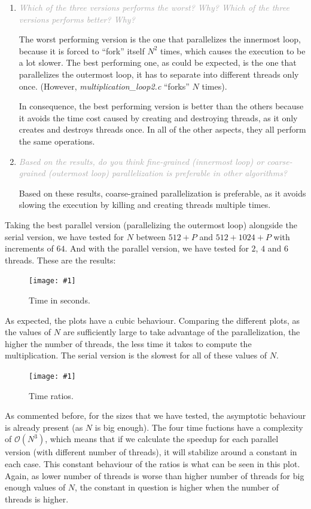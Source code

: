 \documentclass{article}
\newcommand{\myFigure}[4]{%
    \begin{figure}[!ht]
        \texttt{[image: \#1]}
        \centering
        \caption{#2}
        \label{#3}
    \end{figure}
}
\newcommand{\greyItem}[1]{\item\emph{\textcolor{darkgray}{#1}}}
\begin{document}
\begin{enumerate}[label=3.\arabic*,leftmargin=*]
\greyItem{ Which of the three versions performs the worst? Why? Which of the three versions performs better? Why?}

The worst performing version is the one that parallelizes the innermost loop, because it is forced to ``fork'' itself $N^2$ times, which causes the execution to be a lot slower. The best performing one, as could be expected, is the one that parallelizes the outermost loop, it has to separate into different threads only once. (However, \emph{multiplication\_loop2.c} ``forks'' $N$ times).

In consequence, the best performing version is better than the others because it avoids the time cost caused by creating and destroying threads, as it only creates and destroys threads once. In all of the other aspects, they all perform the same operations.

\greyItem{Based on the results, do you think fine-grained (innermost loop) or coarse-grained (outermost loop) parallelization is preferable in other algorithms?}

Based on these results, coarse-grained parallelization is preferable, as it avoids slowing the execution by killing and creating threads multiple times. 

\end{enumerate}

Taking the best parallel version (parallelizing the outermost loop) alongside the serial version, we have tested for $N$ between $512+P$ and $512+1024+P$ with increments of $64$. And with the parallel version, we have tested for $2$, $4$ and $6$ threads. These are the results: 

\myFigure{../material/outputs/out3/test_cl0/t_fig.png}{Time in seconds.}{times_e3}{0.65}

As expected, the plots have a cubic behaviour. Comparing the different plots, as the values of $N$ are sufficiently large to take advantage of the parallelization, the higher the number of threads, the less time it takes to compute the multiplication. The serial version is the slowest for all of these values of $N$.

\myFigure{../material/outputs/out3/test_cl0/r_fig.png}{Time ratios.}{ratios}{0.65}

As commented before, for the sizes that we have tested, the asymptotic behaviour is already present (as $N$ is big enough). The four time fuctions have a complexity of $\mathcal{O}(N^3)$, which means that if we calculate the speedup for each parallel version (with different number of threads), it will stabilize around a constant in each case. This constant behaviour of the ratios is what can be seen in this plot. Again, as lower number of threads is worse than higher number of threads for big enough values of $N$, the constant in question is higher when the number of threads is higher.
\end{document}
